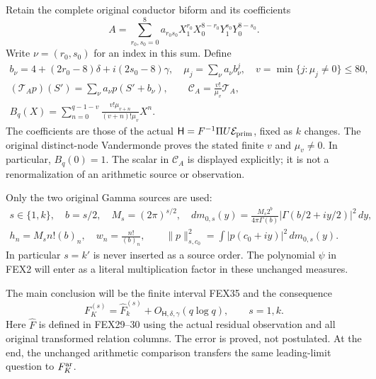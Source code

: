 \documentclass[11pt,a4paper]{article}
\begin{document}
Retain the complete original conductor biform and its coefficients
\[
A=\sum_{r_0,s_0=0}^8a_{r_0s_0}X_1^{r_0}X_0^{8-r_0}Y_1^{s_0}Y_0^{8-s_0}.
\]
Write $\nu=(r_0,s_0)$ for an index in this sum. Define
\[
\begin{gathered}
 b_\nu=4+(2r_0-8)\delta+i(2s_0-8)\gamma,\quad
 \mu_j=\sum_\nu a_\nu b_\nu^j,\quad
 v=\min\{j:\mu_j\ne0\}\le80,\\
 (\mathcal T_Ap)(S')=\sum_\nu a_\nu p(S'+b_\nu),\qquad
 \mathcal C_A=\frac{v!}{\mu_v}\mathcal T_A,\\
 B_q(X)=\sum_{n=0}^{q-1-v}
       \frac{v!\mu_{v+n}}{(v+n)!\mu_v}X^n.
\end{gathered}\tag{FEX3}
\]
The coefficients are those of the actual $\mathsf H=F^{-1}\Pi U
\mathcal E_{\rm prim}$, fixed as $k$ changes. The original distinct-node
Vandermonde proves the stated finite $v$ and $\mu_v\ne0$. In particular,
$B_q(0)=1$. The scalar in $\mathcal C_A$ is displayed explicitly; it is
not a renormalization of an arithmetic source or observation.

Only the two original Gamma sources are used:
\[
\begin{gathered}
 s\in\{1,k\},\quad b=s/2,\quad M_s=(2\pi)^{s/2},\quad
 dm_{0,s}(y)=\frac{M_s2^b}{4\pi\Gamma(b)}
                 |\Gamma(b/2+iy/2)|^2\,dy,\\
 h_n=M_s n!(b)_n,\quad w_n=\frac{n!}{(b)_n},\qquad
 \|p\|_{s,c_0}^2=\int |p(c_0+iy)|^2\,dm_{0,s}(y).
\end{gathered}\tag{FEX4}
\]
In particular $s=k'$ is never inserted as a source order. The polynomial
$\psi$ in FEX2 will enter as a literal multiplication factor in these
unchanged measures.

The main conclusion will be the finite interval FEX35 and the consequence
\[
 \boxed{\quad F_K^{(s)}=\widehat F_k^{(s)}
          +O_{\mathsf H,\delta,\gamma}(q\log q),\qquad s=1,k.\quad}
 \tag{FEX5}
\]
Here $\widehat F$ is defined in FEX29--30 using the actual residual
observation and all original transformed relation columns. The error
is proved, not postulated. At the end, the unchanged arithmetic
comparison transfers the same leading-limit question to $F_K^{\rm ar}$.
\end{document}
